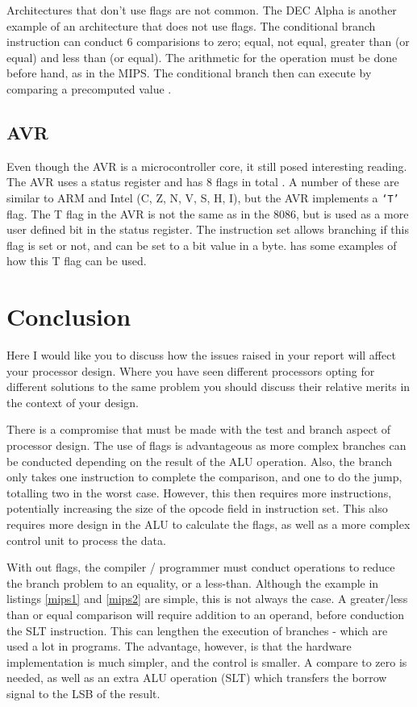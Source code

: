 \documentclass[12pt,a4paper]{article}
\begin{document}
\begin{bibunit}[is-unsrt]
Architectures that don't use flags are not common. 
The DEC Alpha is another example of an architecture that does not use flags.
The conditional branch instruction can conduct 6 comparisions to zero; equal, not equal, greater than (or equal) and less than (or equal).
The arithmetic for the operation must be done before hand, as in the MIPS.
The conditional branch then can execute by comparing a precomputed value \cite{decalpha}. 


\subsection{AVR}
Even though the AVR is a microcontroller core, it still posed interesting reading. 
The AVR uses a status register and has 8 flags in total \cite{atmel:instructions}.
A number of these are similar to ARM and Intel (C, Z, N, V, S, H, I), but the AVR implements a \texttt{`T'} flag.
The T flag in the AVR is not the same as in the 8086, but is used as a more user defined bit in the status register.
The instruction set allows branching if this flag is set or not, and can be set to a bit value in a byte. 
\cite{avr:asm} has some examples of how this T flag can be used.


\section{Conclusion}
Here I would like you to discuss how the issues raised in your report will affect your processor design. Where you have seen different processors opting for different solutions to the same problem you should discuss their relative merits in the context of your design. 

There is a compromise that must be made with the test and branch aspect of processor design.
The use of flags is advantageous as more complex branches can be conducted depending on the result of the ALU operation.
Also, the branch only takes one instruction to complete the comparison, and one to do the jump, totalling two in the worst case.
However, this then requires more instructions, potentially increasing the size of the opcode field in instruction set.
This also requires more design in the ALU to calculate the flags, as well as a more complex control unit to process the data.

With out flags, the compiler / programmer must conduct operations to reduce the branch problem to an equality, or a less-than. 
Although the example in listings \ref{mips1} and \ref{mips2} are simple, this is not always the case. 
A greater/less than or equal comparison will require addition to an operand, before conduction the SLT instruction.
This can lengthen the execution of branches - which are used a lot in programs.
The advantage, however, is that the hardware implementation is much simpler, and the control is smaller.
A compare to zero is needed, as well as an extra ALU operation (SLT) which transfers the borrow signal to the LSB of the result. 


\end{bibunit}
\end{document}
